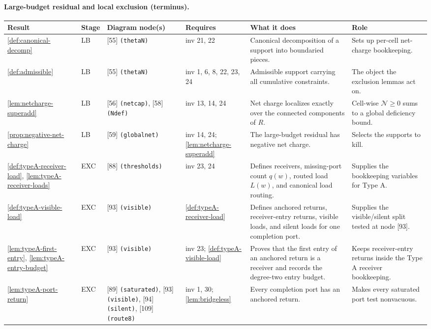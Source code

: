 \documentclass[11pt]{article}
\newcommand{\No}{\mathcal N}
\begin{document}
\paragraph{Large-budget residual and local exclusion (terminus).}
{\scriptsize\setlength{\tabcolsep}{3pt}
\begin{longtable}{L{0.10\textwidth} C{0.045\textwidth} L{0.13\textwidth} L{0.135\textwidth} L{0.28\textwidth} L{0.20\textwidth}}
\toprule
\textbf{Result} & \textbf{Stage} & \textbf{Diagram node(s)} & \textbf{Requires} & \textbf{What it does} & \textbf{Role} \\
\midrule
\endhead
\cref{def:canonical-decomp} & LB & [55] \texttt{(thetaN)} & inv 21, 22 & Canonical decomposition of a support into boundaried pieces. & Sets up per-cell net-charge bookkeeping. \\
\cref{def:admissible} & LB & [55] \texttt{(thetaN)} & inv 1, 6, 8, 22, 23, 24 & Admissible support carrying all cumulative constraints. & The object the exclusion lemmas act on. \\
\cref{lem:netcharge-superadd} & LB & [56] \texttt{(netcap)}, [58] \texttt{(Ndef)} & inv 13, 14, 24 & Net charge localizes exactly over the connected components of $R$. & Cell-wise $\No\ge0$ sums to a global deficiency bound. \\
\cref{prop:negative-net-charge} & LB & [59] \texttt{(globalnet)} & inv 14, 24; \cref{lem:netcharge-superadd} & The large-budget residual has negative net charge. & Selects the supports to kill. \\
\cref{def:typeA-receiver-load}, \cref{lem:typeA-receiver-loads} & EXC & [88] \texttt{(thresholds)} & inv 23, 24 & Defines receivers, missing-port count $q(w)$, routed load $L(w)$, and canonical load routing. & Supplies the bookkeeping variables for Type A. \\
\cref{def:typeA-visible-load} & EXC & [93] \texttt{(visible)} & \cref{def:typeA-receiver-load} & Defines anchored returns, receiver-entry returns, visible loads, and silent loads for one completion port. & Supplies the visible/silent split tested at node [93]. \\
\cref{lem:typeA-first-entry}, \cref{lem:typeA-entry-budget} & EXC & [93] \texttt{(visible)} & inv 23; \cref{def:typeA-visible-load} & Proves that the first entry of an anchored return is a receiver and records the degree-two entry budget. & Keeps receiver-entry returns inside the Type A receiver bookkeeping. \\
\cref{lem:typeA-port-return} & EXC & [89] \texttt{(saturated)}, [93] \texttt{(visible)}, [94] \texttt{(silent)}, [109] \texttt{(route8)} & inv 1, 30; \cref{lem:bridgeless} & Every completion port has an anchored return. & Makes every saturated port test nonvacuous. \\

\end{longtable}}
\end{document}

